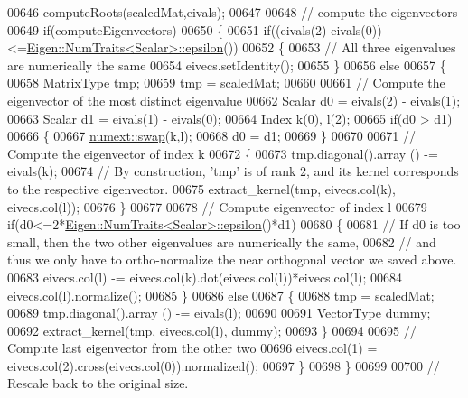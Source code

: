 \begin{DoxyCode}
00646     computeRoots(scaledMat,eivals);
00647 
00648     \textcolor{comment}{// compute the eigenvectors}
00649     \textcolor{keywordflow}{if}(computeEigenvectors)
00650     \{
00651       \textcolor{keywordflow}{if}((eivals(2)-eivals(0))<=\hyperlink{group___core___module_struct_eigen_1_1_num_traits}{Eigen::NumTraits<Scalar>::epsilon}())
00652       \{
00653         \textcolor{comment}{// All three eigenvalues are numerically the same}
00654         eivecs.setIdentity();
00655       \}
00656       \textcolor{keywordflow}{else}
00657       \{
00658         MatrixType tmp;
00659         tmp = scaledMat;
00660 
00661         \textcolor{comment}{// Compute the eigenvector of the most distinct eigenvalue}
00662         Scalar d0 = eivals(2) - eivals(1);
00663         Scalar d1 = eivals(1) - eivals(0);
00664         \hyperlink{group___eigenvalues___module_a8a59ab7734b6eae2754fd78bc7c3a360}{Index} k(0), l(2);
00665         \textcolor{keywordflow}{if}(d0 > d1)
00666         \{
00667           \hyperlink{endian_8c_a3ca5ecd34b04d6a243c054ac3a57f68d}{numext::swap}(k,l);
00668           d0 = d1;
00669         \}
00670 
00671         \textcolor{comment}{// Compute the eigenvector of index k}
00672         \{
00673           tmp.diagonal().array () -= eivals(k);
00674           \textcolor{comment}{// By construction, 'tmp' is of rank 2, and its kernel corresponds to the respective eigenvector.}
00675           extract\_kernel(tmp, eivecs.col(k), eivecs.col(l));
00676         \}
00677 
00678         \textcolor{comment}{// Compute eigenvector of index l}
00679         \textcolor{keywordflow}{if}(d0<=2*\hyperlink{group___core___module_struct_eigen_1_1_num_traits}{Eigen::NumTraits<Scalar>::epsilon}()*d1)
00680         \{
00681           \textcolor{comment}{// If d0 is too small, then the two other eigenvalues are numerically the same,}
00682           \textcolor{comment}{// and thus we only have to ortho-normalize the near orthogonal vector we saved above.}
00683           eivecs.col(l) -= eivecs.col(k).dot(eivecs.col(l))*eivecs.col(l);
00684           eivecs.col(l).normalize();
00685         \}
00686         \textcolor{keywordflow}{else}
00687         \{
00688           tmp = scaledMat;
00689           tmp.diagonal().array () -= eivals(l);
00690 
00691           VectorType dummy;
00692           extract\_kernel(tmp, eivecs.col(l), dummy);
00693         \}
00694 
00695         \textcolor{comment}{// Compute last eigenvector from the other two}
00696         eivecs.col(1) = eivecs.col(2).cross(eivecs.col(0)).normalized();
00697       \}
00698     \}
00699 
00700     \textcolor{comment}{// Rescale back to the original size.}

\end{DoxyCode}
